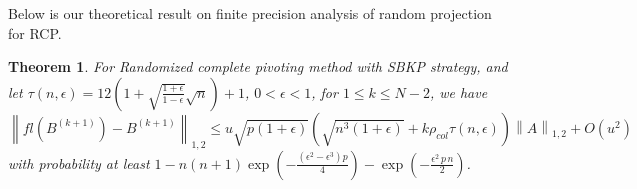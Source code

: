 \documentclass[11pt]{article}
\newtheorem{theorem}{Theorem}[section]
\begin{document}
Below is our theoretical result on finite precision analysis of random projection for RCP.
\begin{theorem} \label{Thm:finite precision analysis}
For Randomized complete pivoting method with SBKP strategy, and let $\tau(n, \epsilon)=12 \left( 1+\sqrt{\frac{1+\epsilon}{1-\epsilon}}\sqrt{n} \right)+1$, $0 < \epsilon < 1$, for $1\le k \le N-2$, we have
\begin{equation*}
    \left\|fl\left(B^{(k+1)}\right)-B^{(k+1)}\right\|_{1,2} 
 \le u \sqrt{p\left(1+\epsilon\right)} \left(\sqrt{n^3(1+\epsilon)} + 
 k \rho_{col} \tau(n, \epsilon)\right) \left\|A\right\|_{1,2} + O(u^2)
\end{equation*}
with probability at least $1-n(n+1) \exp{\left(-\frac{(\epsilon^2-\epsilon^3) p}{4}\right)} - \exp{\left(-\frac{\epsilon^2 \, p \, n}{2} \right)}$.
\end{theorem}
\end{document}
